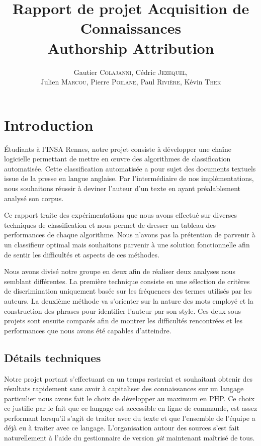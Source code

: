 \documentclass[a4paper,12pt]{report}
\author{Gautier \textsc{Colajanni}, Cédric \textsc{Jezequel},\\ Julien \textsc{Marcou}, Pierre \textsc{Poilane}, Paul \textsc{Rivière}, Kévin \textsc{Thek}}
\title{Rapport de projet Acquisition de Connaissances \\ Authorship Attribution}
\begin{document}


\newpage \thispagestyle{empty}
\null
\newpage 

\renewcommand\contentsname{Sommaire}
\tableofcontents


\section*{Introduction}

Étudiants à l'INSA Rennes, notre projet consiste à développer une chaîne logicielle permettant de mettre en œuvre des algorithmes de classification automatisée. Cette classification automatisée a pour sujet des documents textuels issue de la presse en langue anglaise. Par l'intermédiaire de nos implémentations, nous souhaitons réussir à deviner l'auteur d'un texte en ayant préalablement analysé son corpus.

Ce rapport traite des expérimentations que nous avons effectué sur diverses techniques de classification et nous permet de dresser un tableau des performances de chaque algorithme. Nous n'avons pas la prétention de parvenir à un classifieur optimal mais souhaitons parvenir à une solution fonctionnelle afin de sentir les difficultés et aspects de ces méthodes.

Nous avons divisé notre groupe en deux afin de réaliser deux analyses nous semblant différentes. La première technique consiste en une sélection de critères de discrimination uniquement basée sur les fréquences des termes utilisés par les auteurs. La deuxième méthode va s'orienter sur la nature des mots employé et la construction des phrases pour identifier l'auteur par son style. Ces deux sous-projets sont ensuite comparés afin de montrer les difficultés rencontrées et les performances que nous avons été capables d'atteindre.

\subsection*{Détails techniques}

Notre projet portant s'effectuant en un temps restreint et souhaitant obtenir des résultats rapidement sans avoir à capitaliser des connaissances sur un langage particulier nous avons fait le choix de développer au maximum en PHP. Ce choix ce justifie par le fait que ce langage est accessible en ligne de commande, est assez performant lorsqu'il s'agit de traiter avec du texte et que l'ensemble de l'équipe a déjà eu à traiter avec ce langage. 
L'organisation autour des sources s'est fait naturellement à l'aide du gestionnaire de version \textit{git} maintenant maîtrisé de tous.
\end{document}
